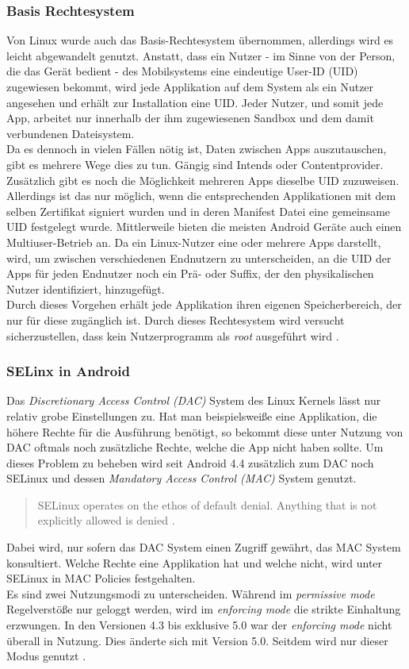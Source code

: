	\subsubsection{Basis Rechtesystem}\label{sec:BasisRechteSystem}
	Von Linux wurde auch das Basis-Rechtesystem übernommen, allerdings wird es
	leicht abgewandelt genutzt. Anstatt, dass ein Nutzer - im Sinne von der Person,
	die das Gerät bedient - des Mobilsystems eine eindeutige User-ID (UID)
	zugewiesen bekommt, wird jede Applikation auf dem System als ein Nutzer
	angesehen und erhält zur Installation eine UID. Jeder Nutzer, und somit
	jede App, arbeitet nur innerhalb der ihm zugewiesenen Sandbox und dem damit
	verbundenen Dateisystem.\\
	Da es dennoch in vielen Fällen nötig ist, Daten zwischen Apps
	auszutauschen, gibt es mehrere Wege dies zu tun. Gängig sind
	Intends oder Contentprovider. Zusätzlich gibt es noch die Möglichkeit mehreren
	Apps dieselbe UID zuzuweisen. Allerdings ist das nur möglich, wenn die
	entsprechenden Applikationen mit dem selben Zertifikat signiert wurden und in
	deren Manifest Datei eine gemeinsame UID festgelegt wurde.
	Mittlerweile bieten die meisten Android Geräte auch einen Multiuser-Betrieb
	an. Da ein Linux-Nutzer eine oder mehrere Apps darstellt, wird, um zwischen
	verschiedenen Endnutzern zu unterscheiden, an die UID der Apps für jeden
	Endnutzer noch ein Prä- oder Suffix, der den physikalischen Nutzer
	identifiziert, hinzugefügt.\\
	Durch dieses Vorgehen erhält jede Applikation ihren eigenen Speicherbereich,
	der nur für diese zugänglich ist. Durch dieses Rechtesystem wird versucht
	sicherzustellen, dass kein Nutzerprogramm als \textit{root} ausgeführt wird
	\cite[S. 12-14]{Elenkov2014}.
	
	\subsubsection{SELinx in Android}
	Das \textit{Discretionary Access Control (DAC)} System des Linux Kernels lässt
	nur relativ grobe Einstellungen zu. Hat man beispielsweiße eine Applikation,
	die höhere Rechte für die Ausführung benötigt, so bekommt diese unter Nutzung
	von DAC oftmals noch zusätzliche Rechte, welche die App nicht haben sollte.	Um
	dieses Problem zu beheben wird seit Android 4.4 zusätzlich zum DAC noch
	SELinux und dessen \textit{Mandatory Access Control (MAC)} System genutzt.
	\begin{quote}
	SELinux operates on the ethos of default denial. Anything that is not
	explicitly allowed is denied \cite{SELinuxAndroid}.
	\end{quote}
	Dabei wird, nur sofern das DAC System einen Zugriff gewährt, das MAC System
	konsultiert. Welche Rechte eine Applikation hat und welche nicht, wird unter
	SELinux in MAC Policies festgehalten.\\
	Es sind zwei Nutzungsmodi zu unterscheiden. Während im \textit{permissive
	mode} Regelverstöße nur geloggt werden, wird im \textit{enforcing mode} die
	strikte Einhaltung erzwungen. In den Versionen 4.3 bis exklusive 5.0 war der
	\textit{enforcing mode} nicht überall in Nutzung. Dies änderte sich mit
	Version 5.0. Seitdem wird nur dieser Modus genutzt \cite{SELinuxAndroid}.	